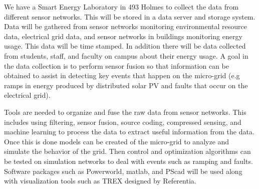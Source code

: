 We have a Smart Energy Laboratory in 493 Holmes to collect the data from different
sensor networks.  This will be stored in a data server and storage system.  Data will
be gathered from sensor networks monitoring environmental resource data, electrical grid
data, and sensor networks in buildings monitoring energy usage.  This data will be time
stamped.  In addition there will be data collected from students, staff, and faculty on campus
about their energy usage.  A goal in the data collection is to perform sensor fusion so that
information can be obtained to  assist in detecting key events that happen on the
micro-grid (e.g ramps in energy produced by distributed solar PV and faults that occur on
the electrical grid).  

Tools are needed to organize and fuse the raw data from sensor networks.  This includes
using  filtering, sensor fusion, source coding, compressed sensing,  and machine learning to
process the data to extract useful information from the data.  Once this is done models can
be created of the micro-grid to analyze and simulate the behavior of the grid.   Then control
and optimization algorithms can be tested on simulation networks to deal with events such
as ramping and faults.  Software packages such as Powerworld, matlab, and PScad will
be used along with visualization tools such as TREX designed by Referentia.




  


 



